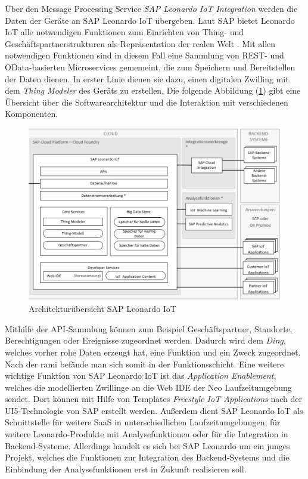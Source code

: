 Über den Message Processing Service \textit{SAP Leonardo IoT Integration} werden die Daten der Geräte an SAP Leonardo IoT übergeben. Laut SAP bietet Leonardo IoT \glqq alle notwendigen Funktionen zum Einrichten von Thing- und Geschäftspartnerstrukturen als Repräsentation der realen Welt\grqq{} \citep[S. 11]{SAP2019}. Mit allen notwendigen Funktionen sind in diesem Fall eine Sammlung von REST- und OData-basierten Microservices gememeint, die zum Speichern und Bereitstellen der Daten dienen. In erster Linie dienen sie dazu, einen digitalen Zwilling mit dem \textit{Thing Modeler} des Geräts zu erstellen. Die folgende Abbildung (\ref{leoae}) gibt eine Übersicht über die Softwarearchitektur und die Interaktion mit verschiedenen Komponenten.
\begin{figure}[H]
  \centering
  \includegraphics[width=1.0\linewidth]{pictures/leo_ae}
  \caption[Architekturübersicht SAP Leonardo IoT]{Architekturübersicht SAP Leonardo IoT \citep[S. 12]{SAP2019}}
  \label{leoae}
\end{figure}
 \noindent Mithilfe der API-Sammlung können zum Beispiel Geschäftspartner, Standorte, Berechtigungen oder Ereignisse zugeordnet werden. Dadurch wird dem \textit{Ding}, welches vorher rohe Daten erzeugt hat, eine Funktion und ein Zweck zugeordnet. Nach der \ac{rami} befände man sich somit in der Funktionsschicht. Eine weitere wichtige Funktion von SAP Leonardo IoT ist das \textit{Application Enablement}, welches die modellierten Zwillinge an die Web IDE der Neo Laufzeitumgebung sendet. Dort können mit Hilfe von Templates \textit{Freestyle IoT Applications} nach der UI5-Technologie von SAP erstellt werden. Außerdem dient SAP Leonardo IoT als Schnittstelle für weitere SaaS in unterschiedlichen Laufzeitumgebungen, für weitere Leonardo-Produkte mit Analysefunktionen oder für die Integration in Backend-Systeme. Allerdings handelt es sich bei SAP Leonardo um ein junges Projekt, welches die Funktionen zur Integration des Backend-Systems und die Einbindung der Analysefunktionen erst in Zukunft realisieren soll.

